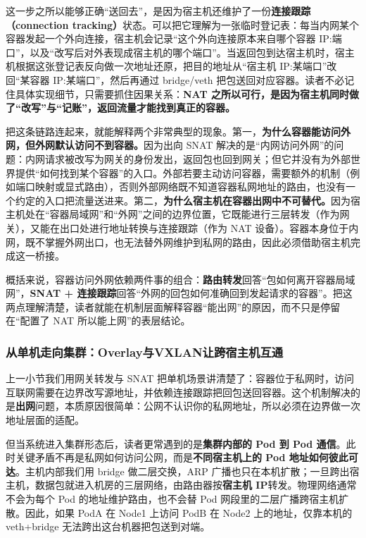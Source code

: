 这一步之所以能够正确“送回去”，是因为宿主机还维护了一份\textbf{连接跟踪（connection tracking）}状态。可以把它理解为一张临时登记表：每当内网某个容器发起一个外向连接，宿主机会记录“这个外向连接原本来自哪个容器 IP:端口”，以及“改写后对外表现成宿主机的哪个端口”。当返回包到达宿主机时，宿主机根据这张登记表反向做一次地址还原，把目的地址从“宿主机 IP:某端口”改回“某容器 IP:某端口”，然后再通过 bridge/veth 把包送回对应容器。读者不必记住具体实现细节，只需要抓住因果关系：\textbf{NAT 之所以可行，是因为宿主机同时做了“改写”与“记账”，返回流量才能找到真正的容器。}

把这条链路连起来，就能解释两个非常典型的现象。第一，\textbf{为什么容器能访问外网，但外网默认访问不到容器。}因为出向 SNAT 解决的是“内网访问外网”的问题：内网请求被改写为网关的身份发出，返回包也回到网关；但它并没有为外部世界提供“如何找到某个容器”的入口。外部若要主动访问容器，需要额外的机制（例如端口映射或显式路由），否则外部网络既不知道容器私网地址的路由，也没有一个约定的入口把流量送进来。第二，\textbf{为什么宿主机在容器出网中不可替代。}因为宿主机处在“容器局域网”和“外网”之间的边界位置，它既能进行三层转发（作为网关），又能在出口处进行地址转换与连接跟踪（作为 NAT 设备）。容器本身位于内网，既不掌握外网出口，也无法替外网维护到私网的路由，因此必须借助宿主机完成这一桥接。

概括来说，容器访问外网依赖两件事的组合：\textbf{路由转发}回答“包如何离开容器局域网”，\textbf{SNAT + 连接跟踪}回答“外网的回包如何准确回到发起请求的容器”。把这两点理解清楚，读者就能在机制层面解释容器“能出网”的原因，而不只是停留在“配置了 NAT 所以能上网”的表层结论。


\subsubsection{从单机走向集群：Overlay与VXLAN让跨宿主机互通}

上一小节我们用网关转发与 SNAT 把单机场景讲清楚了：容器位于私网时，访问互联网需要在边界改写源地址，并依赖连接跟踪把回包送回容器。这个机制解决的是\textbf{出网}问题，本质原因很简单：公网不认识你的私网地址，所以必须在边界做一次地址层面的适配。

但当系统进入集群形态后，读者更常遇到的是\textbf{集群内部的 Pod 到 Pod 通信}。此时关键矛盾不再是私网如何访问公网，而是\textbf{不同宿主机上的 Pod 地址如何彼此可达}。主机内部我们用 bridge 做二层交换，ARP 广播也只在本机扩散；一旦跨出宿主机，数据包就进入机房的三层网络，由路由器按\textbf{宿主机 IP}转发。物理网络通常不会为每个 Pod 的地址维护路由，也不会替 Pod 网段里的二层广播跨宿主机扩散。因此，如果 PodA 在 Node1 上访问 PodB 在 Node2 上的地址，仅靠本机的 veth+bridge 无法跨出这台机器把包送到对端。

